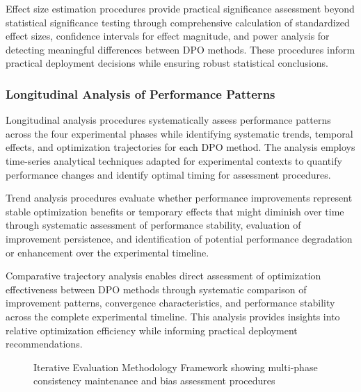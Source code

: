 Effect size estimation procedures provide practical significance assessment beyond statistical significance testing through comprehensive calculation of standardized effect sizes, confidence intervals for effect magnitude, and power analysis for detecting meaningful differences between DPO methods. These procedures inform practical deployment decisions while ensuring robust statistical conclusions.

\subsubsection{Longitudinal Analysis of Performance Patterns}

Longitudinal analysis procedures systematically assess performance patterns across the four experimental phases while identifying systematic trends, temporal effects, and optimization trajectories for each DPO method. The analysis employs time-series analytical techniques adapted for experimental contexts to quantify performance changes and identify optimal timing for assessment procedures.

Trend analysis procedures evaluate whether performance improvements represent stable optimization benefits or temporary effects that might diminish over time through systematic assessment of performance stability, evaluation of improvement persistence, and identification of potential performance degradation or enhancement over the experimental timeline.

Comparative trajectory analysis enables direct assessment of optimization effectiveness between DPO methods through systematic comparison of improvement patterns, convergence characteristics, and performance stability across the complete experimental timeline. This analysis provides insights into relative optimization efficiency while informing practical deployment recommendations.

\begin{figure}[htbp]
    \centering
    \caption{Iterative Evaluation Methodology Framework showing multi-phase consistency maintenance and bias assessment procedures}
    \label{fig:iterative-evaluation}
\end{figure}

